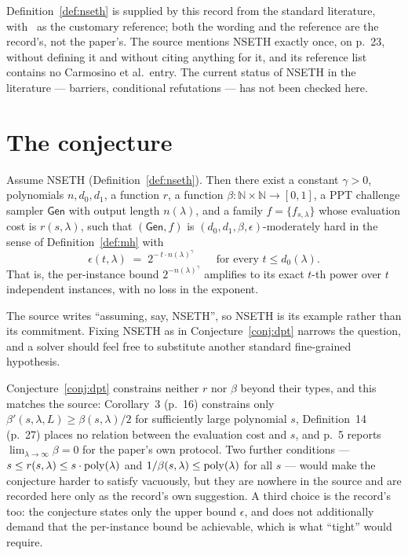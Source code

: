 \documentclass{aicr-conjecture}
\newcommand{\NN}{\mathbb{N}}
\newcommand{\Gen}{\mathsf{Gen}}
\begin{document}
\begin{remark}\label{rem:nseth}
Definition~\ref{def:nseth} is supplied by this record from the standard literature, with~\cite{CGIMPS16} as the customary reference; both the wording and the reference are the record's, not the paper's. The source mentions NSETH exactly once, on p.~23, without defining it and without citing anything for it, and its reference list contains no Carmosino et al.\ entry. The current status of NSETH in the literature --- barriers, conditional refutations --- has not been checked here.
\end{remark}

\section{The conjecture}\label{sec:conjectures}

\begin{conjecture}\label{conj:dpt}
Assume NSETH (Definition~\ref{def:nseth}). Then there exist a constant $\gamma > 0$, polynomials $n, d_0, d_1$, a function $r$, a function $\beta : \NN \times \NN \to [0,1]$, a PPT challenge sampler $\Gen$ with output length $n(\lambda)$, and a family $f = \{f_{s,\lambda}\}$ whose evaluation cost is $r(s,\lambda)$, such that $(\Gen, f)$ is $(d_0,d_1,\beta,\epsilon)$-moderately hard in the sense of Definition~\ref{def:mh} with
\[
\epsilon(t,\lambda) \;=\; 2^{-\,t \cdot n(\lambda)^{\gamma}} \qquad \text{for every } t \le d_0(\lambda).
\]
That is, the per-instance bound $2^{-n(\lambda)^{\gamma}}$ amplifies to its exact $t$-th power over $t$ independent instances, with no loss in the exponent.
\end{conjecture}

\begin{remark}
The source writes ``assuming, say, NSETH'', so NSETH is its example rather than its commitment. Fixing NSETH as in Conjecture~\ref{conj:dpt} narrows the question, and a solver should feel free to substitute another standard fine-grained hypothesis.
\end{remark}

\begin{remark}
Conjecture~\ref{conj:dpt} constrains neither $r$ nor $\beta$ beyond their types, and this matches the source: Corollary~3 (p.~16) constrains only $\beta'(s,\lambda,L) \ge \beta(s,\lambda)/2$ for sufficiently large polynomial $s$, Definition~14 (p.~27) places no relation between the evaluation cost and $s$, and p.~5 reports $\lim_{\lambda \to \infty} \beta = 0$ for the paper's own protocol. Two further conditions --- $s \le r(s,\lambda) \le s \cdot \mathrm{poly}(\lambda)$ and $1/\beta(s,\lambda) \le \mathrm{poly}(\lambda)$ for all $s$ --- would make the conjecture harder to satisfy vacuously, but they are nowhere in the source and are recorded here only as the record's own suggestion. A third choice is the record's too: the conjecture states only the upper bound $\epsilon$, and does not additionally demand that the per-instance bound be achievable, which is what ``tight'' would require.
\end{remark}
\end{document}
